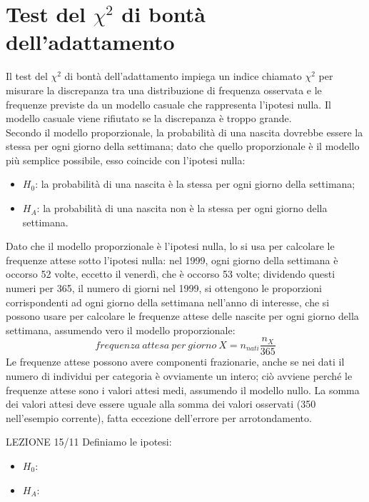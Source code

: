 \documentclass[10pt, draft]{book}
\newcounter{example}[section]
\begin{document}
\section{Test del \texorpdfstring{$\chi^2$}{Lg} di bontà dell'adattamento}

Il test del $\chi^2$ di bontà dell'adattamento impiega un indice chiamato $\chi^2$ per misurare la discrepanza tra una distribuzione di frequenza osservata e le frequenze previste da un modello casuale che rappresenta l'ipotesi nulla. Il modello casuale viene rifiutato se la discrepanza è troppo grande.
\\
Secondo il modello proporzionale, la probabilità di una nascita dovrebbe essere la stessa per ogni giorno della settimana; dato che quello proporzionale è il modello più semplice possibile, esso coincide con l'ipotesi nulla:
\begin{itemize}
\item $H_0$: la probabilità di una nascita è la stessa per ogni giorno della settimana;
\item $H_A$: la probabilità di una nascita non è la stessa per ogni giorno della settimana.
\end{itemize}
Dato che il modello proporzionale è l'ipotesi nulla, lo si usa per calcolare le frequenze attese sotto l'ipotesi nulla: nel 1999, ogni giorno della settimana è occorso 52 volte, eccetto il venerdì, che è occorso 53 volte; dividendo questi numeri per 365, il numero di giorni nel 1999, si ottengono le proporzioni corrispondenti ad ogni giorno della settimana nell'anno di interesse, che si possono usare per calcolare le frequenze attese delle nascite per ogni giorno della settimana, assumendo vero il modello proporzionale:
\begin{equation}
frequenza \ attesa \ per \ giorno \ X = n_{nati} \frac{n_X}{365}
\end{equation}
Le frequenze attese possono avere componenti frazionarie, anche se nei dati il numero di individui per categoria è ovviamente un intero; ciò avviene perché le frequenze attese sono i valori attesi medi, assumendo il modello nullo. La somma dei valori attesi deve essere uguale alla somma dei valori osservati (350 nell'esempio corrente), fatta eccezione dell'errore per arrotondamento.
\begin{example}
    LEZIONE 15/11
    Definiamo le ipotesi:
    \begin{itemize}
    \item $H_0$:
    \item $H_A$:
    \end{itemize}
\end{example}
\end{document}
